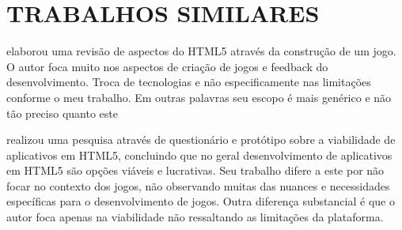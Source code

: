 \section{TRABALHOS SIMILARES}
\cite{crossPlatformMobileGame} elaborou uma revisão de aspectos do
HTML5 através da construção de um jogo. O autor foca muito nos
aspectos de criação de jogos e feedback do desenvolvimento. Troca
de tecnologias e não especificamente nas limitações conforme o meu
trabalho. Em outras palavras seu escopo é mais genérico e não tão
preciso quanto este

\cite{aSeriousContender} realizou uma pesquisa através de questionário
e protótipo sobre a viabilidade de aplicativos em HTML5, concluindo que
no geral desenvolvimento de aplicativos em HTML5 são opções viáveis
e lucrativas. Seu trabalho difere a este por não focar no contexto dos
jogos, não observando muitas das nuances e necessidades específicas
para o desenvolvimento de jogos. Outra diferença substancial é que o autor foca apenas na viabilidade não ressaltando as limitações da plataforma.
